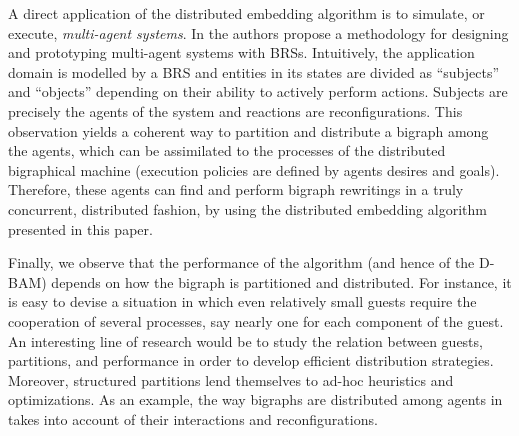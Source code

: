 \documentclass[a4paper,english,10pt]{article}
\theoremstyle{plain}\newtheorem{theorem}{Theorem}
\theoremstyle{plain}\newtheorem{corollary}[theorem]{Corollary}
\theoremstyle{plain}\newtheorem{proposition}[theorem]{Proposition}
\theoremstyle{plain}\newtheorem{lemma}[theorem]{Lemma}
\theoremstyle{plain}\newtheorem{definition}{Definition}
\theoremstyle{plain}\newtheorem{remark}{Remark}
\theoremstyle{plain}\newtheorem{example}[remark]{Example}
\newcommand{\?}[1]{}
\begin{document}
A direct application of the distributed embedding algorithm is to
simulate, or execute, \emph{multi-agent systems}.  In
\cite{mmp:dais14} the authors propose a methodology for designing and
prototyping multi-agent systems with BRSs. Intuitively, the
application domain is modelled by a BRS and entities in its states are
divided as ``subjects'' and ``objects'' depending on their ability to
actively perform actions. Subjects are precisely the agents of the
system and reactions are reconfigurations.  This observation yields a
coherent way to partition and distribute a bigraph among the agents,
which can be assimilated to the processes of the distributed
bigraphical machine (execution policies are defined by agents desires
and goals).  Therefore, these agents can find and perform bigraph
rewritings in a truly concurrent, distributed fashion, by using the
distributed embedding algorithm presented in this paper.

Finally, we observe that the performance of the algorithm (and hence
of the D-BAM) depends on how the bigraph is partitioned and
distributed. For instance, it is easy to devise a situation in which
even relatively small guests require the cooperation of several
processes, say nearly one for each component of the guest. An
interesting line of research would be to study the relation between
guests, partitions, and performance in order to develop efficient
distribution strategies. Moreover, structured partitions lend
themselves to ad-hoc heuristics and optimizations.  As an example, the
way bigraphs are distributed among agents in \cite{mmp:dais14} takes
into account of their interactions and reconfigurations.
\end{document}

